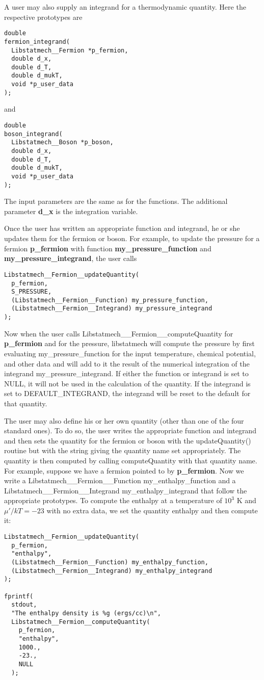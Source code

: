 \documentclass{article}    %
\begin{document}
A user may also supply an integrand for a thermodynamic quantity.  Here
the respective prototypes are
\begin{verbatim}
double
fermion_integrand(
  Libstatmech__Fermion *p_fermion,
  double d_x,
  double d_T,
  double d_mukT,
  void *p_user_data
);
\end{verbatim}
and
\begin{verbatim}
double
boson_integrand(
  Libstatmech__Boson *p_boson,
  double d_x,
  double d_T,
  double d_mukT,
  void *p_user_data
);
\end{verbatim}
The input parameters are the same as for the functions.  The additional
parameter {\bf d\_x} is the integration variable.

Once the user has written an appropriate function and integrand, he or she
updates them for the fermion or boson.  For example, to update the
pressure for a fermion {\bf p\_fermion} with function
{\bf my\_pressure\_function} and
{\bf my\_pressure\_integrand}, the user calls
\begin{verbatim}
Libstatmech__Fermion__updateQuantity(
  p_fermion,
  S_PRESSURE,
  (Libstatmech__Fermion__Function) my_pressure_function,
  (Libstatmech__Fermion__Integrand) my_pressure_integrand
);
\end{verbatim}
Now when the user calls Libstatmech\_\_Fermion\_\_computeQuantity for
{\bf p\_fermion} and for the pressure, libstatmech will compute the pressure
by first evaluating my\_pressure\_function for the input temperature,
chemical potential, and other data and will add to it the result of
the numerical integration of the integrand my\_pressure\_integrand.
If either the function or integrand is set to NULL, it will not be used
in the calculation of the quantity.  If the integrand is set to
DEFAULT\_INTEGRAND, the integrand will be reset to the default for that
quantity.

The user may also define his or her own quantity (other than one of the
four standard ones).  To do so, the user writes the appropriate function
and integrand and then sets the quantity for the fermion or boson with
the updateQuantity() routine but with the string giving the quantity name
set appropriately.  The quantity is then computed by calling
computeQuantity with that quantity name.  For example, suppose we have
a fermion pointed to by {\bf p\_fermion}.  Now we write a
Libstatmech\_\_Fermion\_\_Function my\_enthalpy\_function and
a Libstatmech\_\_Fermion\_\_Integrand my\_enthalpy\_integrand that
follow the appropriate prototypes.  To compute the enthalpy at a temperature
of $10^3$ K and $\mu'/kT = -23$ with no extra data, we set
the quantity enthalpy and then compute it:
\begin{verbatim}
Libstatmech__Fermion__updateQuantity(
  p_fermion,
  "enthalpy",
  (Libstatmech__Fermion__Function) my_enthalpy_function,
  (Libstatmech__Fermion__Integrand) my_enthalpy_integrand
);

fprintf(
  stdout,
  "The enthalpy density is %g (ergs/cc)\n",
  Libstatmech__Fermion__computeQuantity(
    p_fermion,
    "enthalpy",
    1000.,
    -23.,
    NULL
  ); 
\end{verbatim}
\end{document}
